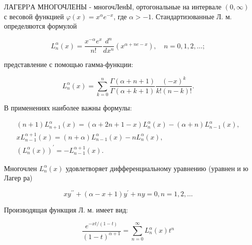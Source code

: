 \documentclass[10pt]{article}
\begin{document}
ЛАГЕРPА МНОГОЧЛЕНЫ - многочЛенЫ, ортогональные на интервале $(0, \infty)$ с весовой функцией $\varphi(x)=x^{\alpha} e^{-x}$, где $\alpha>-1$. Стандартизованные Л. м. определяются формулой



\[

L_{n}^{\alpha}(x)=\frac{x^{-\alpha} e^{x}}{n !} \frac{d^{n}}{d x^{n}}\left(x^{\alpha+n e-x}\right), \quad n=0,1,2, \ldots ;

\]



представление с помощью гамма-функции:



\[

L_{n}^{\alpha}(x)=\sum_{k=0}^{n} \frac{\Gamma(\alpha+n+1)}{\Gamma(\alpha+k+1)} \frac{(-x)^{k}}{k !(n-k) !} .

\]



В применениях наиболее важны формулы:



\[

\begin{gathered}

(n+1) L_{n+1}^{\alpha}(x)=(\alpha+2 n+1-x) L_{n}^{\alpha}(x)-(\alpha+n) L_{n-1}^{\alpha}(x), \\

x L_{n-1}^{\alpha+1}(x)=(n+\alpha) L_{n-1}^{\alpha}(x)-n L_{n}^{\alpha}(x), \\

\left(L_{n}^{\alpha}(x)\right)^{\prime}=-L_{n-1}^{\alpha+1}(x) .

\end{gathered}

\]



Многочлен $L_{n}^{\alpha}(x)$ удовлетворяет дифференциальному уравнению (уравнен и ю Лагер ра)



\[

x y^{\prime \prime}+(\alpha-x+1) y^{\prime}+n y=0, n=1,2, \ldots

\]



Производящая функщия Л. м. имеет вид:



\[

\frac{e^{-x t /(1-t)}}{(1-t)^{\alpha+1}}=\sum_{n=0}^{\infty} L_{n}^{\alpha}(x) t^{n}

\]
\end{document}
